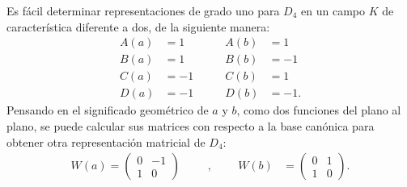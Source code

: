 \begin{ejemplo}[Representación de $D_4$]
Es fácil determinar representaciones de grado uno para $D_4$ en un campo $K$ de característica diferente a dos, de la siguiente manera:
\begin{equation*}
\begin{aligned}
A(a) & = 1\\
B(a) & = 1 \\ 
C(a) & = -1 \\
D(a) & = -1
\end{aligned}
\qquad 
\begin{aligned}
A(b) & = 1\\
B(b) & =  -1 \\
C(b) & = 1 \\
D(b) & = -1.
\end{aligned}
\end{equation*}
\indent Pensando en el significado geométrico de $a$ y $b$, como dos funciones del plano al plano, se puede calcular sus matrices con respecto a la base canónica para obtener otra representación matricial de $D_4$:
\begin{equation*}
\begin{aligned}
W(a) = \begin{pmatrix}
0 & -1 \\
1 & 0
\end{pmatrix}
\end{aligned}
\qquad \text{,} \qquad
\begin{aligned}
W(b) &= \begin{pmatrix}
 0 & 1 \\
 1 & 0
\end{pmatrix}. 
\end{aligned}
\end{equation*}
\end{ejemplo}

